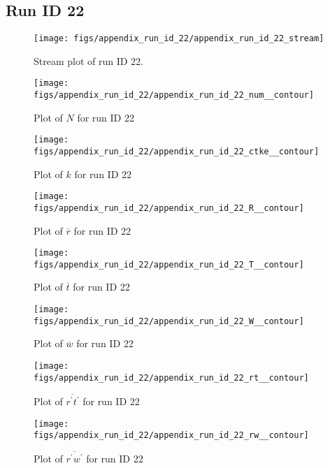 \subsection{Run ID 22}
\begin{figure}[H]
\centering
\texttt{[image: figs/appendix\_run\_id\_22/appendix\_run\_id\_22\_stream]}
\caption{Stream plot of run ID 22.}
\label{fig:appendix_run_id_22_stream}
\end{figure}


\begin{figure}[H]
\centering
\texttt{[image: figs/appendix\_run\_id\_22/appendix\_run\_id\_22\_num\_\_contour]}
\caption{Plot of $N$ for run ID 22}
\label{fig:appendix_run_id_22_num__contour}
\end{figure}


\begin{figure}[H]
\centering
\texttt{[image: figs/appendix\_run\_id\_22/appendix\_run\_id\_22\_ctke\_\_contour]}
\caption{Plot of $k$ for run ID 22}
\label{fig:appendix_run_id_22_ctke__contour}
\end{figure}


\begin{figure}[H]
\centering
\texttt{[image: figs/appendix\_run\_id\_22/appendix\_run\_id\_22\_R\_\_contour]}
\caption{Plot of $\overline{r}$ for run ID 22}
\label{fig:appendix_run_id_22_R__contour}
\end{figure}


\begin{figure}[H]
\centering
\texttt{[image: figs/appendix\_run\_id\_22/appendix\_run\_id\_22\_T\_\_contour]}
\caption{Plot of $\overline{t}$ for run ID 22}
\label{fig:appendix_run_id_22_T__contour}
\end{figure}


\begin{figure}[H]
\centering
\texttt{[image: figs/appendix\_run\_id\_22/appendix\_run\_id\_22\_W\_\_contour]}
\caption{Plot of $\overline{w}$ for run ID 22}
\label{fig:appendix_run_id_22_W__contour}
\end{figure}


\begin{figure}[H]
\centering
\texttt{[image: figs/appendix\_run\_id\_22/appendix\_run\_id\_22\_rt\_\_contour]}
\caption{Plot of $\overline{r^\prime t^\prime}$ for run ID 22}
\label{fig:appendix_run_id_22_rt__contour}
\end{figure}


\begin{figure}[H]
\centering
\texttt{[image: figs/appendix\_run\_id\_22/appendix\_run\_id\_22\_rw\_\_contour]}
\caption{Plot of $\overline{r^\prime w^\prime}$ for run ID 22}
\label{fig:appendix_run_id_22_rw__contour}
\end{figure}


